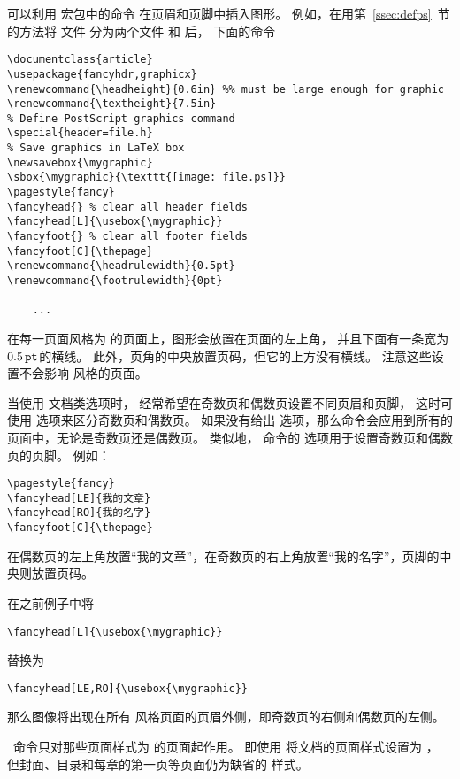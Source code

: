 可以利用  宏包中的命令
在页眉和页脚中插入图形。
例如，在用第~\ref{ssec:defps}~节的方法将  文件  分为两个文件  和  后，
下面的命令
\begin{lstlisting}
\documentclass{article}
\usepackage{fancyhdr,graphicx}
\renewcommand{\headheight}{0.6in} %% must be large enough for graphic
\renewcommand{\textheight}{7.5in}
% Define PostScript graphics command
\special{header=file.h}
% Save graphics in LaTeX box
\newsavebox{\mygraphic}
\sbox{\mygraphic}{\texttt{[image: file.ps]}}
\pagestyle{fancy}
\fancyhead{} % clear all header fields
\fancyhead[L]{\usebox{\mygraphic}}
\fancyfoot{} % clear all footer fields
\fancyfoot[C]{\thepage}
\renewcommand{\headrulewidth}{0.5pt}
\renewcommand{\footrulewidth}{0pt}

	...

\end{lstlisting}
在每一页面风格为  的页面上，图形会放置在页面的左上角，
并且下面有一条宽为 $0.5\,\mathtt{pt}$的横线。
此外，页角的中央放置页码，但它的上方没有横线。
注意这些设置不会影响  风格的页面。

当使用 \opt{[twoside]} 文档类选项时，
经常希望在奇数页和偶数页设置不同页眉和页脚，
这时可使用  选项来区分奇数页和偶数页。
如果没有给出  选项，那么命令会应用到所有的页面中，无论是奇数页还是偶数页。
类似地， 命令的  选项用于设置奇数页和偶数页的页脚。
例如：
\begin{lstlisting}
\pagestyle{fancy}
\fancyhead[LE]{我的文章}
\fancyhead[RO]{我的名字}
\fancyfoot[C]{\thepage}
\end{lstlisting}
在偶数页的左上角放置“我的文章”，在奇数页的右上角放置“我的名字”，页脚的中央则放置页码。

在之前例子中将
\begin{lstlisting}
\fancyhead[L]{\usebox{\mygraphic}}
\end{lstlisting}
替换为
\begin{lstlisting}
\fancyhead[LE,RO]{\usebox{\mygraphic}}
\end{lstlisting}
那么图像将出现在所有 风格页面的页眉外侧，即奇数页的右侧和偶数页的左侧。

~命令只对那些页面样式为  的页面起作用。
即使用  将文档的页面样式设置为 ，
但封面、目录和每章的第一页等页面仍为缺省的  样式。

